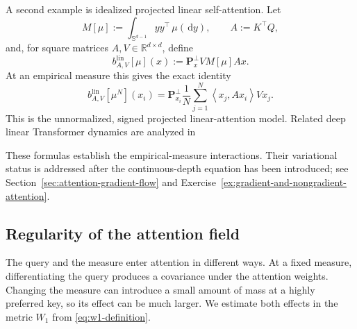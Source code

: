 \documentclass[11pt]{amsart}
\numberwithin{equation}{section}
\theoremstyle{plain}
\newcommand{\R}{\mathbb{R}}
\newcommand{\dd}{\,\mathrm{d}}
\newcommand{\ip}[2]{\left\langle#1,#2\right\rangle}
\begin{document}
A second example is idealized projected linear self-attention.  Let
\[
 M[\mu]:=\int_{\mathbb S^{d-1}}yy^\top\,\mu(\dd y),
 \qquad A:=K^\top Q,
\]
and, for square matrices $A,V\in\R^{d\times d}$, define
\begin{equation}\label{eq:projected-linear-attention-field}
 b_{A,V}^{\mathrm{lin}}[\mu](x)
 :=\mathbf P_x^\perp V M[\mu]A x.
\end{equation}
At an empirical measure this gives the exact identity
\[
 b_{A,V}^{\mathrm{lin}}[\mu^N](x_i)
 =\mathbf P_{x_i}^\perp\frac1N\sum_{j=1}^N
   \ip{x_j}{A x_i}Vx_j.
\]
This is the unnormalized, signed projected linear-attention model. Related deep linear Transformer dynamics are analyzed in \cite{LiEtAl2026DeepLinear}

These formulas establish the empirical-measure interactions.  Their
variational status is addressed after the continuous-depth equation has been
introduced; see Section~\ref{sec:attention-gradient-flow} and
Exercise~\ref{ex:gradient-and-nongradient-attention}.

\subsection{Regularity of the attention field}

The query and the measure enter attention in different ways.  At a fixed
measure, differentiating the query produces a covariance under the
attention weights.  Changing the measure can introduce a small amount of
mass at a highly preferred key, so its effect can be much larger.  We
estimate both effects in the metric $W_1$ from \eqref{eq:w1-definition}.
\end{document}
